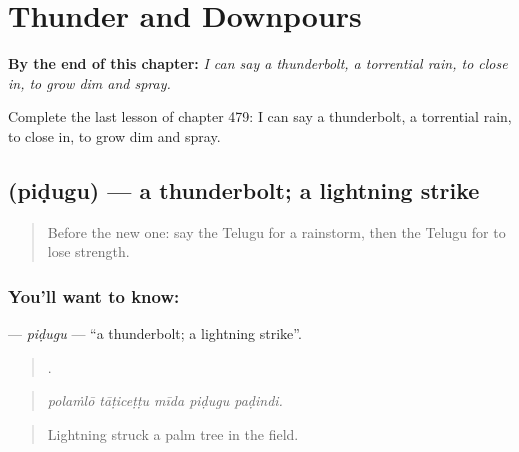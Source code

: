 
\chapter{Thunder and Downpours}
\label{ch:te-thunder-and-downpours}

\begin{chapteropening}
\textbf{By the end of this chapter:} \emph{I can say a thunderbolt, a torrential rain, to close in, to grow dim and spray.}

Complete the last lesson of chapter 479: I can say a thunderbolt, a torrential rain, to close in, to grow dim and spray.
\end{chapteropening}

\section[\texorpdfstring{\te{పిడుగు} (piḍugu)}{పిడుగు (piḍugu)}]{ (piḍugu) — a thunderbolt; a lightning strike}

\label{lesson:TE-C479-pidugu}



\begin{quote}
Before the new one: say the Telugu for a rainstorm, then the Telugu for to lose strength.
\end{quote}

\subsection*{You'll want to know: }
\textbf{} — \emph{piḍugu} — \textquotedblleft{}a thunderbolt; a lightning strike\textquotedblright{}.

\begin{quote}
    .
\end{quote}

\begin{quote}
\emph{polaṁlō tāṭiceṭṭu mīda piḍugu paḍindi.}
\end{quote}

\begin{quote}
Lightning struck a palm tree in the field.
\end{quote}

